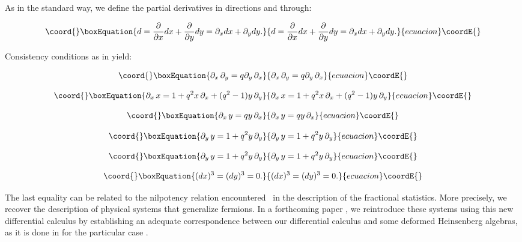 \documentclass[a4paper,12pt,thmsa]{article}
\begin{document}
As in the standard way, we define the partial derivatives in directions \coordHE{}
and \coordHE{} through:

\begin{equation}\coord{}\boxEquation{
d=\frac \partial {\partial x}dx+\frac \partial {\partial y}dy=\partial
_xdx+\partial _ydy.
}{
d=\frac \partial {\partial x}dx+\frac \partial {\partial y}dy=\partial
_xdx+\partial _ydy.
}{ecuacion}\coordE{}\end{equation}

Consistency conditions as in \myHighlight{$[9]$}\coordHE{} yield:

\begin{equation}\coord{}\boxEquation{
\partial _{x}\, \partial _{y}=q\partial _{y}\, \partial _{x}
}{
\partial _{x}\, \partial _{y}=q\partial _{y}\, \partial _{x}
}{ecuacion}\coordE{}\end{equation}

\begin{equation}\coord{}\boxEquation{
\partial _{x}\, x=1+q^{2}x\, \partial _{x}+(q^{2}-1)y\, 
\partial _{y}
}{
\partial _{x}\, x=1+q^{2}x\, \partial _{x}+(q^{2}-1)y\, 
\partial _{y}
}{ecuacion}\coordE{}\end{equation}

\begin{equation}\coord{}\boxEquation{
\partial _{x}\, y=qy\, \partial _{x}
}{
\partial _{x}\, y=qy\, \partial _{x}
}{ecuacion}\coordE{}\end{equation}

\begin{equation}\coord{}\boxEquation{
\partial _{y}\, y=1+q^{2}y\, \partial _{y}
}{
\partial _{y}\, y=1+q^{2}y\, \partial _{y}
}{ecuacion}\coordE{}\end{equation}

\begin{equation}\coord{}\boxEquation{
\partial _{y}\, y=1+q^{2}y\, \partial _{y}
}{
\partial _{y}\, y=1+q^{2}y\, \partial _{y}
}{ecuacion}\coordE{}\end{equation}

\begin{equation}\coord{}\boxEquation{
(dx)^{3}=(dy)^{3}=0.
}{
(dx)^{3}=(dy)^{3}=0.
}{ecuacion}\coordE{}\end{equation}

The last equality \coordHE{} can be related to the nilpotency relation
encountered \ in the description of the fractional statistics. More
precisely, we recover the description of physical systems that generalize
fermions. In a forthcoming paper \myHighlight{$\left[ 13\right] $}\coordHE{}, we reintroduce these
systems using this new differential calculus by establishing an adequate
correspondence between our differential calculus and some deformed
Heinsenberg algebras, as it is done in \myHighlight{$\left[ 14\right] $}\coordHE{} for the
particular case \coordHE{}.
\end{document}
